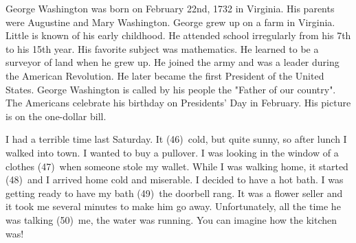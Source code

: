 \documentclass[11pt]{article}
\begin{document}
\begin{enumerate}[\causo]
\foreachproblem[btchontu]{\item\thisproblem}
\end{enumerate}

George Washington was born on February 22nd, 1732 in Virginia. His parents were Augustine and Mary Washington. George grew up on a farm in Virginia. Little is known of his early childhood. He attended school irregularly from his 7th to his 15th year. His favorite subject was mathematics. He learned to be a surveyor of land when he grew up. He joined the army and was a leader during the American Revolution. He later became the first President of the United States. George Washington is called by his people the "Father of our country". The Americans celebrate his birthday on Presidents' Day in February. His picture is on the one-dollar bill.

\foreachproblem[btdungtu]{
\begin{enumerate}[]
\item\causo\thisproblem
\end{enumerate}
}

\begin{enumerate}[]
\foreachproblem[btcumtu]{\item\causo\thisproblem}
\end{enumerate}

\begin{enumerate}[]
\foreachproblem[bthoanthanh]{\item\causo\thisproblem}
\end{enumerate}


I had a terrible time last Saturday. It (46)\daugach\  cold, but quite sunny, so after lunch I walked into town. I wanted to buy a pullover. I was looking in the window of a clothes (47)\daugach\ when someone stole my wallet. While I was walking home, it started (48)\daugach\ and I arrived home cold and miserable. I decided to have a hot bath. I was getting ready to have my bath (49)\daugach\ the doorbell rang. It was a flower seller and it took me several minutes to make him go away. Unfortunately, all the time he was talking (50)\daugach\ me, the water was running. You can imagine how the kitchen was!
\end{document}

